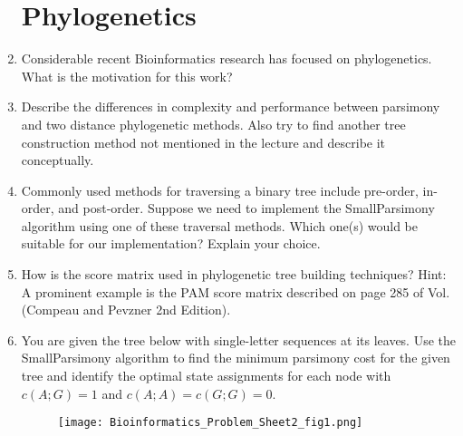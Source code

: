 \documentclass[11pt,runningheads,a4paper]{article}
\begin{document}
\begin{enumerate}
\section*{Phylogenetics}
  \item Considerable recent Bioinformatics research has focused on phylogenetics. What is the motivation for this work?
  \item Describe the differences in complexity and performance between parsimony and two distance phylogenetic methods. Also try to find another tree construction method not mentioned in the lecture and describe it conceptually.
  \item Commonly used methods for traversing a binary tree include pre-order, in-order, and post-order.
    Suppose we need to implement the SmallParsimony algorithm using one of these traversal methods.
    Which one(s) would be suitable for our implementation? Explain your choice.
  \item  How is the score matrix used in phylogenetic tree building techniques? Hint: A prominent example is the PAM score matrix described on page 285 of Vol. (Compeau and Pevzner 2nd Edition).
  \item You are given the tree below with single-letter sequences at its leaves.
    Use the SmallParsimony algorithm to find the minimum parsimony cost for the given tree and identify the optimal state assignments for each node with $c(A; G) = 1$ and $c(A; A) = c(G; G) = 0$.
    \begin{figure}[h]
      \centering
      \texttt{[image: Bioinformatics\_Problem\_Sheet2\_fig1.png]}
    \end{figure}

\end{enumerate}
\end{document}

